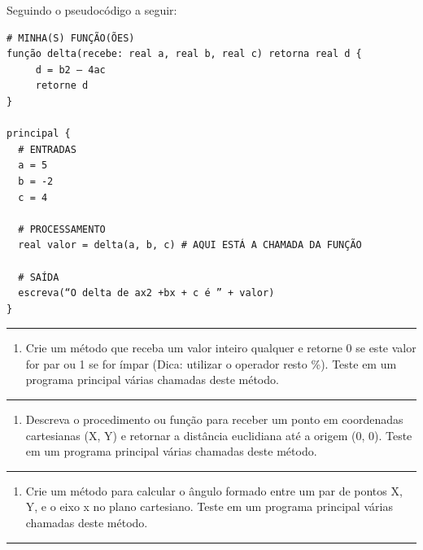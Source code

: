 \documentclass[12pt,a4paper]{article}
\providecommand{\tightlist}{%
      \setlength{\itemsep}{0pt}\setlength{\parskip}{0pt}}
\begin{document}
Seguindo o pseudocódigo a seguir:

    \begin{verbatim}
# MINHA(S) FUNÇÃO(ÕES)
função delta(recebe: real a, real b, real c) retorna real d {
     d = b2 – 4ac
     retorne d
}

principal {
  # ENTRADAS
  a = 5
  b = -2
  c = 4

  # PROCESSAMENTO
  real valor = delta(a, b, c) # AQUI ESTÁ A CHAMADA DA FUNÇÃO
  
  # SAÍDA
  escreva(“O delta de ax2 +bx + c é ” + valor)
}
\end{verbatim}

    \begin{center}\rule{0.5\linewidth}{0.5pt}\end{center}

\begin{enumerate}
\def\labelenumi{\arabic{enumi}.}
\tightlist
\item
  Crie um método que receba um valor inteiro qualquer e retorne 0 se
  este valor for par ou 1 se for ímpar (Dica: utilizar o operador resto
  \%). Teste em um programa principal várias chamadas deste método.
\end{enumerate}

    \begin{center}\rule{0.5\linewidth}{0.5pt}\end{center}

\begin{enumerate}
\def\labelenumi{\arabic{enumi}.}
\setcounter{enumi}{1}
\tightlist
\item
  Descreva o procedimento ou função para receber um ponto em coordenadas
  cartesianas (X, Y) e retornar a distância euclidiana até a origem (0,
  0). Teste em um programa principal várias chamadas deste método.
\end{enumerate}

    \begin{center}\rule{0.5\linewidth}{0.5pt}\end{center}

\begin{enumerate}
\def\labelenumi{\arabic{enumi}.}
\setcounter{enumi}{2}
\tightlist
\item
  Crie um método para calcular o ângulo formado entre um par de pontos
  X, Y, e o eixo x no plano cartesiano. Teste em um programa principal
  várias chamadas deste método.
\end{enumerate}

    \begin{center}\rule{0.5\linewidth}{0.5pt}\end{center}
\end{document}
